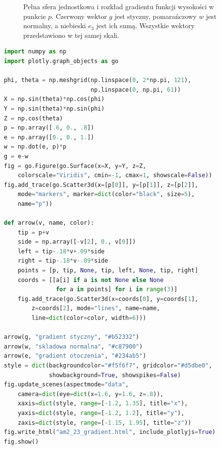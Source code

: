 \begin{figure}[htbp]
\centering
{}
\caption{Pełna sfera jednostkowa i rozkład gradientu
funkcji wysokości w punkcie $p$. Czerwony wektor $g$
jest styczny, pomarańczowy $w$ jest normalny, a niebieski
$e_3$ jest ich sumą. Wszystkie wektory przedstawiono
w tej samej skali.}
\label{ma2:fig:sphere-gradient}
\end{figure}

\begin{lstlisting}[language=Python]
import numpy as np
import plotly.graph_objects as go

phi, theta = np.meshgrid(np.linspace(0, 2*np.pi, 121),
                         np.linspace(0, np.pi, 61))
X = np.sin(theta)*np.cos(phi)
Y = np.sin(theta)*np.sin(phi)
Z = np.cos(theta)
p = np.array([.6, 0., .8])
e = np.array([0., 0., 1.])
w = np.dot(e, p)*p
g = e-w
fig = go.Figure(go.Surface(x=X, y=Y, z=Z,
    colorscale="Viridis", cmin=-1, cmax=1, showscale=False))
fig.add_trace(go.Scatter3d(x=[p[0]], y=[p[1]], z=[p[2]],
    mode="markers", marker=dict(color="black", size=5),
    name="p"))

def arrow(v, name, color):
    tip = p+v
    side = np.array([-v[2], 0., v[0]])
    left = tip-.18*v+.09*side
    right = tip-.18*v-.09*side
    points = [p, tip, None, tip, left, None, tip, right]
    coords = [[a[i] if a is not None else None
               for a in points] for i in range(3)]
    fig.add_trace(go.Scatter3d(x=coords[0], y=coords[1],
        z=coords[2], mode="lines", name=name,
        line=dict(color=color, width=6)))

arrow(g, "gradient styczny", "#b52332")
arrow(w, "skladowa normalna", "#c87900")
arrow(e, "gradient otoczenia", "#234ab5")
style = dict(backgroundcolor="#f5f6f7", gridcolor="#d5dbe0",
             showbackground=True, showspikes=False)
fig.update_scenes(aspectmode="data",
    camera=dict(eye=dict(x=1.6, y=1.6, z=.8)),
    xaxis=dict(style, range=[-1.2, 1.35], title="x"),
    yaxis=dict(style, range=[-1.2, 1.2], title="y"),
    zaxis=dict(style, range=[-1.15, 1.95], title="z"))
fig.write_html("am2_23_gradient.html", include_plotlyjs=True)
fig.show()
\end{lstlisting}
